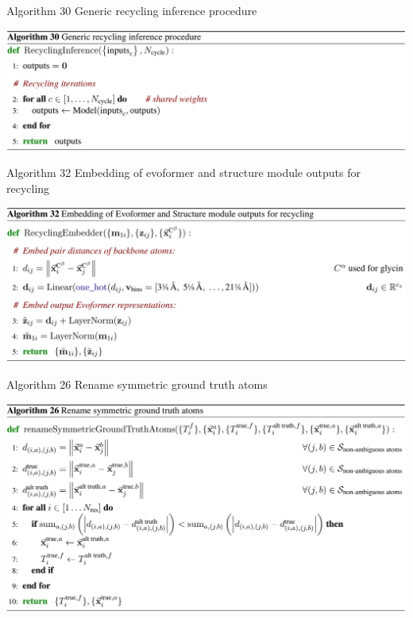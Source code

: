 \documentclass[presentation, smaller]{beamer}
\begin{document}
\begin{frame}[label={sec:orgbb2ef35}]{Algorithm 30 Generic recycling inference procedure \cite{jumperHighlyAccurateProtein2021}}
\begin{center}
\includegraphics[width=.9\linewidth]{./imgs/recycling-algo30.png}
\end{center}
\end{frame}
\begin{frame}[label={sec:org550ce4a}]{Algorithm 32 Embedding of evoformer and structure module outputs for recycling \cite{jumperHighlyAccurateProtein2021}}
\begin{center}
\includegraphics[width=.9\linewidth]{./imgs/recycling-embedding-algo32.png}
\end{center}
\end{frame}
\begin{frame}[label={sec:org71dc79c}]{Algorithm 26 Rename symmetric ground truth atoms \cite{jumperHighlyAccurateProtein2021}}
\begin{center}
\includegraphics[width=.9\linewidth]{./imgs/rename-truth-atoms-algo26.png}
\end{center}
\end{frame}
\end{document}
